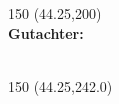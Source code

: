 \begin{titlepage}
\begin{textblock}{150} (44.25,200)
  \large \textsf
  {\fontsize{14pt}{14pt}\\
  \textbf{Gutachter:}\\
  \Erstgutachter\\
  \Zweitgutachter}
\end{textblock}

\begin{textblock}{150} (44.25,242.0)
  \fontsize{11.75pt}{11.75pt}
  \textcolor{TUGreen}{\textsf \Lehrstuhl}\\
  \textcolor{TUGreen}{\textsf \Lehrstuhltitel}\\
  \textcolor{TUGreen}{\textsf \Uni}
\end{textblock}

\vspace*{20cm}

\end{titlepage}

